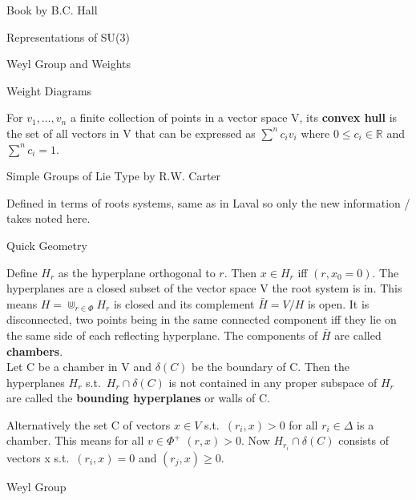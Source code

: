 \documentclass[12pt, letterpaper]{article}
\newcommand{\R}{\mathbb{R}}
\begin{document}
\begin{section}{Book by B.C. Hall}
\begin{subsection}{Representations of SU(3)}
\begin{subsubsection}{Weyl Group and Weights}
    \end{subsubsection}

    \begin{subsubsection}{Weight Diagrams}

      For \(v_{1}, \dots, v_{n}\) a finite collection of points in a vector
      space V, its \textbf{convex hull} is the set of all vectors in V that can
      be expressed as \(\sum^{n} c_{i} v_{i}\) where \(0 \leq c_{i} \in \R\) and
      \(\sum^{n} c_{i} = 1\).

    \end{subsubsection}

  \end{subsection}

\end{section}

\begin{section}{Simple Groups of Lie Type by R.W. Carter}

  Defined in terms of roots systems, same as in Laval so only the new
  information / takes noted here.

  \begin{subsection}{Quick Geometry}

    Define \(H_{r}\) as the hyperplane orthogonal to \(r\). Then \(x \in H_{r}\)
    iff \((r, x_0 = 0)\). The hyperplanes are a closed subset of the vector
    space V the root system is in. This means \(H = \Cup_{r \in \Phi} H_{r}\) is
    closed and its complement \(\bar{H} = V / H\) is open. It is disconnected,
    two points being in the same connected component iff they lie on the same
    side of each reflecting hyperplane. The components of \(\bar{H}\) are called
    \textbf{chambers}. \\
    Let C be a chamber in V and \(\delta(C)\) be the boundary of C. Then the
    hyperplanes \(H_{r}\) s.t.\ \(H_{r} \cap \delta(C)\) is not contained in any
    proper subspace of \(H_{r}\) are called the \textbf{bounding hyperplanes} or
    walls of C.

    Alternatively the set C of vectors \(x \in V\) s.t.\ \((r_{i}, x) > 0\) for
    all \(r_{i} \in \Delta\) is a chamber. This means for all \(v \in \Phi^{+}\)
    \((r, x) > 0\). Now \(H_{r_{i}} \cap \delta(C)\) consists of vectors x s.t.\
    \((r_{i}, x) = 0\) and \((r_{j}, x) \geq 0\).

  \end{subsection}

  \begin{subsection}{Weyl Group}


\end{subsection}
\end{section}
\end{document}
